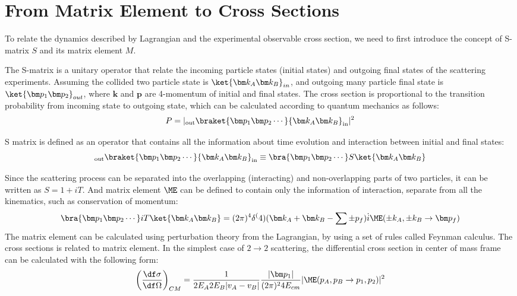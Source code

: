  \section{From Matrix Element to Cross Sections}
 \label{sec:ME}
 To relate the dynamics described by Lagrangian and the experimental observable cross section, we need to first introduce the concept of S-matrix $S$ and its matrix element $M$. 
 
 The S-matrix is a unitary operator that relate the incoming particle states (initial states)  and outgoing final states of the scattering experiments. Assuming the collided two particle state is $\ket{\bm k_A\bm k_B}_{in}$, and outgoing many particle final state is $\ket{\bm p_1 \bm p_2}_{out}$, where $\bm k$ and $\bm p$ are 4-momentum of initial and final states. The cross section is proportional to the transition probability from incoming state to outgoing state, which can be calculated according to quantum mechanics as follows:
 \begin{equation}
 P=|_{\mathrm{out}}\braket{\bm p_1 \bm p_2 \cdots}{\bm k_A\bm k_B}_{\mathrm{in}}|^2
 \end{equation}
 
 S matrix is defined as an operator that contains all the information about time evolution and interaction between initial and final states:
 \begin{equation}
 _{\mathrm{out}}\braket{\bm p_1 \bm p_2 \cdots}{\bm k_A\bm k_B}_{\mathrm{in}} \equiv \bra{\bm p_1 \bm p_2 \cdots}S\ket{\bm k_A\bm k_B}
 \end{equation}
 
 Since the scattering process can be separated into the overlapping (interacting)  and non-overlapping parts of two particles, it can be written as $S=1+iT$. And matrix element $\ME$ can be defined to contain only the information of interaction, separate from all the kinematics, such as conservation of momentum:
 \begin{equation}
 \bra{\bm p_1 \bm p_2 \cdots}iT\ket{\bm k_A\bm k_B}=(2\pi)^4\delta^(4)(\bm k_A+\bm k_B-\sum \pm p_f)\dot i\ME(\pm k_A,\pm k_B\rightarrow \bm p_f)
 \end{equation}
 The matrix element can be calculated using perturbation theory from the Lagrangian, by using a set of rules called Feynman calculus. The cross sections is related to matrix element. In the simplest case of $2\rightarrow2$ scattering, the differential cross section in center of mass frame can be calculated with the following form:
 \begin{equation}
 \left(\frac{\df \sigma}{\df \Omega}\right)_{CM} = \frac{1}{2 E_A 2 E_B |v_A-v_B|}\frac{|\bm p_1|}{(2\pi)^2 4E_{cm}}|\ME(p_A,p_B\rightarrow p_1,p_2)|^2
 \end{equation}
 
